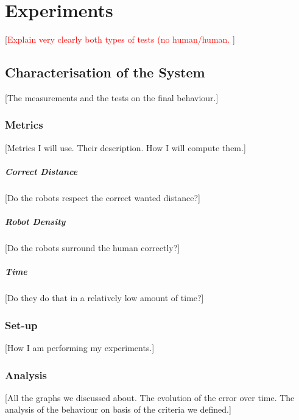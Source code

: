 \documentclass[oneside, a4paper, 12pt]{memoir}
\begin{document}
\chapter{Experiments}
\label{chap:experiments}
[\textcolor{red}{Explain very clearly both types of tests (no human/human.} ]

	\section{Characterisation of the System}
	[The measurements and the tests on the final behaviour.]

		\subsection{Metrics}
		
		[Metrics I will use. Their description. How I will compute them.]
		
			\paragraph{Correct Distance}
			
			[Do the robots respect the correct wanted distance?]
			
			\paragraph{Robot Density}
			
			[Do the robots surround the human correctly?]
			
			\paragraph{Time}
			
			[Do they do that in a relatively low amount of time?]
			
		\subsection{Set-up}
		
		[How I am performing my experiments.]
		
		\subsection{Analysis}
		
		[All the graphs we discussed about. The evolution of the error over time. The analysis of the behaviour on basis of the criteria we defined.]
		
\end{document}
